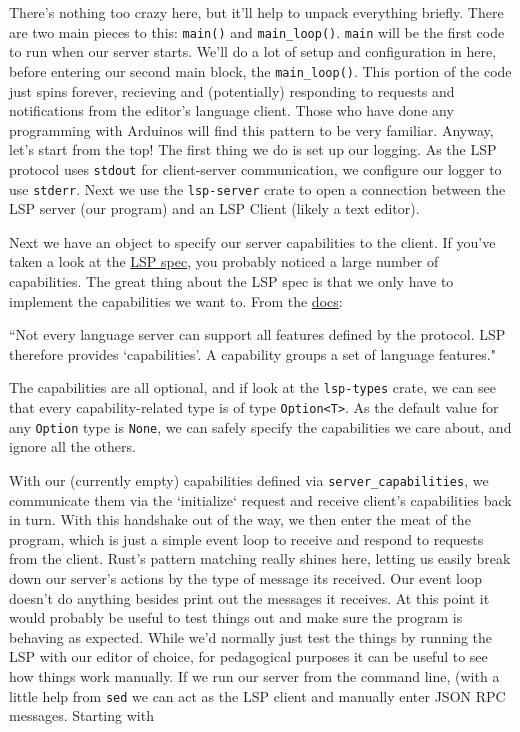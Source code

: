 There's nothing too crazy here, but it'll help to unpack everything briefly. There are two main pieces to this: \texttt{main()} and \texttt{main\_loop()}. \texttt{main} will be the first code to run when our server starts. We'll do a lot of setup and configuration in here, before entering our second main block, the \texttt{main\_loop()}. This portion of the code just spins forever, recieving and (potentially) responding  to requests and notifications from the editor's language client. Those who have done any programming with Arduinos will find this pattern to be very familiar. Anyway, let's start from the top! The first thing we do is set up our logging. As the LSP protocol uses \texttt{stdout} for client-server communication, we configure our logger to use \texttt{stderr}. Next we use the \texttt{lsp-server} crate to open a connection between the LSP server (our program) and an LSP Client (likely a text editor).

Next we have an object to specify our server capabilities to the client. If you've taken a look at the \href{https://microsoft.github.io/language-server-protocol/specifications/lsp/3.17/specification/}{LSP spec}, you probably noticed a large number of capabilities. The great thing about the LSP spec is that we only have to implement the capabilities we want to. From the \href{https://microsoft.github.io/language-server-protocol/specifications/lsp/3.17/specification/\#capabilities}{docs}:

\begin{center}
	``Not every language server can support all features defined by the protocol.
	LSP therefore provides ‘capabilities’. A capability groups a set of language
	features."
\end{center}

The capabilities are all optional, and if look at the \texttt{lsp-types} crate, we can see that every capability-related type is of type \texttt{Option<T>}. As the default value for any \texttt{Option} type is \texttt{None}, we can safely specify the capabilities we care about, and ignore all the others.

With our (currently empty) capabilities defined via \texttt{server\_capabilities}, we communicate them via the `initialize` request and receive client's capabilities back in turn. With this handshake out of the way, we then enter the meat of the program, which is just a simple event loop to receive and respond to requests from the client. Rust's pattern matching really shines here, letting us easily break down our server's actions by the type of message its received. Our event loop doesn't do anything besides print out the messages it receives. At this point it would probably be useful to test things out and make sure the program is behaving as expected. While we'd normally just test the things by running the LSP with our editor of choice, for pedagogical purposes it can be useful to see how things work manually. If we run our server from the command line, (with a little help from \texttt{sed} we can act as the LSP client and manually enter JSON RPC messages. Starting with

